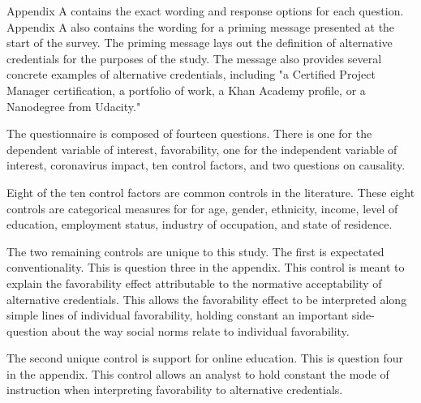 \documentclass[review]{elsarticle}
\begin{document}
Appendix A contains the exact wording and response options for each question.
Appendix A also contains the wording for a priming message presented at the start of the survey.
The priming message lays out the definition of alternative credentials for the purposes of the study.
The message also provides several concrete examples of alternative credentials,
including "a Certified Project Manager certification,
a portfolio of work, a Khan Academy profile, or a Nanodegree from Udacity."

The questionnaire is composed of fourteen questions.
There is one for the dependent variable of interest, favorability,
one for the independent variable of interest, coronavirus impact,
ten control factors,
and two questions on causality.

Eight of the ten control factors are common controls in the literature.
These eight controls are categorical measures for
for age, gender, ethnicity, income,
level of education, employment status, industry of occupation, and state of residence.

The two remaining controls are unique to this study.
The first is expectated conventionality.
This is question three in the appendix.
This control is meant to explain the favorability effect attributable to the normative acceptability of alternative credentials.
This allows the favorability effect to be interpreted along simple lines of individual favorability,
holding constant an important side-question about the way social norms relate to individual favorability.

The second unique control is support for online education.
This is question four in the appendix.
This control allows an analyst to hold constant the mode of instruction when interpreting favorability to alternative credentials.
\end{document}
